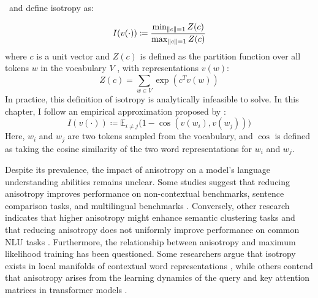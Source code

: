 \citet{arora2016latent}\ and \citet{mu2018all} define isotropy as:

\begin{equation}
    I(v(\cdot)) \coloneq \frac{\min_{\left\lVert c\right\rVert=1} Z(c)}{\max_{\left\lVert c\right\rVert=1} Z(c)}
\end{equation}
where $c$ is a unit vector and $Z(c)$ is defined as the partition function over all tokens $w$ in the vocabulary $V$ , with representations $v(w)$:
$$
    Z(c) = \sum_{w \in V} \exp(c^Tv(w))
$$
In practice, this definition of isotropy is analytically infeasible to solve. In this chapter, I follow an empirical approximation proposed by \citet{ethayarajh2019contextual}: 
\begin{equation}
\label{eq:empirical-isotropy}
    I(v(\cdot)) \coloneq \mathbb{E}_{i\ne j}\big(1-\cos(v(w_i), v(w_j))\big)
\end{equation}
Here, $w_i$ and $w_j$ are two tokens sampled from the vocabulary, and $\cos$ is defined as taking the cosine similarity of the two word representations for $w_i$ and $w_j$.  

Despite its prevalence, the impact of anisotropy on a model's language understanding abilities remains unclear. Some studies suggest that reducing anisotropy improves performance on non-contextual benchmarks, sentence comparison tasks, and multilingual benchmarks \citep{bis2021too, su2021whitening, rajaee2022isotropy}. Conversely, other research indicates that higher anisotropy might enhance semantic clustering tasks and that reducing anisotropy does not uniformly improve performance on common NLU tasks \citep{ait2023anisotropy, ding2022isotropy}. Furthermore, the relationship between anisotropy and maximum likelihood training has been questioned. Some researchers argue that isotropy exists in local manifolds of contextual word representations \citep{cai2020isotropy}, while others contend that anisotropy arises from the learning dynamics of the query and key attention matrices in transformer models \citep{godey2024anisotropy}.



